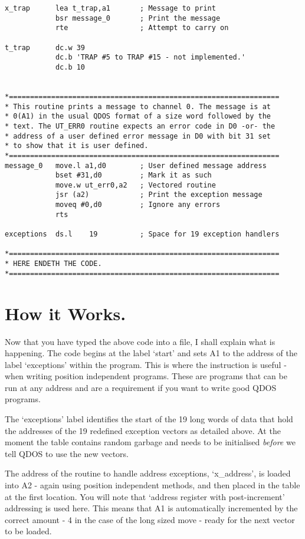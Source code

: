 \begin{lstlisting}[firstnumber=1,caption={Exception Handler for the QL},label={lst:ExceptionHandlerQL}]
x_trap      lea t_trap,a1       ; Message to print
            bsr message_0       ; Print the message
            rte                 ; Attempt to carry on

t_trap      dc.w 39
            dc.b 'TRAP #5 to TRAP #15 - not implemented.'
            dc.b 10


*================================================================
* This routine prints a message to channel 0. The message is at 
* 0(A1) in the usual QDOS format of a size word followed by the 
* text. The UT_ERR0 routine expects an error code in D0 -or- the 
* address of a user defined error message in D0 with bit 31 set 
* to show that it is user defined.
*================================================================
message_0   move.l a1,d0        ; User defined message address
            bset #31,d0         ; Mark it as such
            move.w ut_err0,a2   ; Vectored routine
            jsr (a2)            ; Print the exception message
            moveq #0,d0         ; Ignore any errors
            rts

exceptions  ds.l    19          ; Space for 19 exception handlers

*================================================================
* HERE ENDETH THE CODE.
*================================================================
\end{lstlisting}

\section{How it Works.}
\label{ch6-how-it-works}%

Now that you have typed the above code into a file, I shall explain
    what is happening. The code begins at the label `start' and sets A1 to the
    address of the label `exceptions' within the program. This is where the
     instruction is useful -{} when writing position independent programs.
    These are programs that can be run at any address and are a requirement if
    you want to write good QDOS programs.

The `exceptions' label identifies the start of the 19 long words of
    data that hold the addresses of the 19 redefined exception vectors as
    detailed above. At the moment the table contains random garbage and needs
    to be initialised \emph{before} we tell QDOS to use the new vectors.

The address of the routine to handle address exceptions,
    `x\_address', is loaded into A2 -{} again using position independent methods,
    and then placed in the table at the first location. You will note that
    `address register with post-{}increment' addressing is used here. This means
    that A1 is automatically incremented by the correct amount -{} 4 in the case
    of the long sized move -{} ready for the next vector to be loaded.

